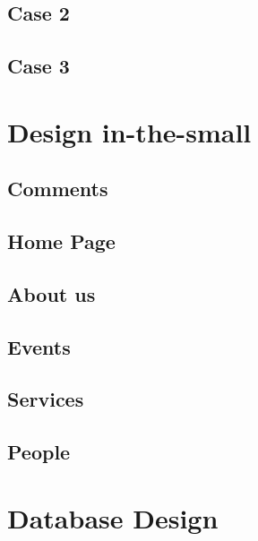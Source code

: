 \documentclass[11pt, a4paperm, hidelinks]{article}
\begin{document}
	\subsection{Case 2}
	
\clearpage

	\subsection{Case 3}
	
	\clearpage


	\section{Design in-the-small}

	\subsection{Comments}
	

	\subsection{Home Page}
	
	\clearpage

	\subsection{About us}
	
	\clearpage

	\subsection{Events}
	
	\clearpage

	\subsection{Services}
	
	\clearpage

	\subsection{People}
	
	\clearpage

	\section{Database Design}	
	
	\clearpage
\end{document}

